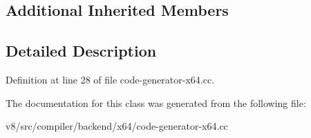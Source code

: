 \subsection*{Additional Inherited Members}


\subsection{Detailed Description}


Definition at line 28 of file code-\/generator-\/x64.\+cc.



The documentation for this class was generated from the following file\+:\begin{DoxyCompactItemize}
\item 
v8/src/compiler/backend/x64/code-\/generator-\/x64.\+cc\end{DoxyCompactItemize}
